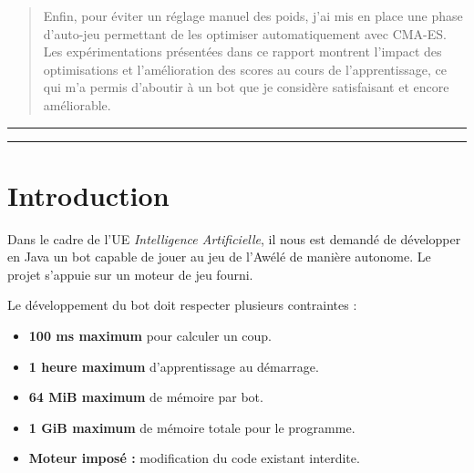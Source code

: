 \documentclass[11pt,a4paper]{article}
\newcommand{\doublebar}{%
  \par\noindent\centering
  \rule{\linewidth}{0.7pt}\par\vspace{-12pt}%
  \rule{\linewidth}{0.7pt}\par
}
\begin{document}
\begin{center}
\begin{minipage}{0.9\linewidth}
\begin{quote}
\hspace*{\parindent}Enfin, pour éviter un réglage manuel des poids, j’ai mis en place une phase d’auto-jeu permettant de les
optimiser automatiquement avec CMA-ES. Les expérimentations présentées dans ce rapport montrent l’impact des optimisations
et l’amélioration des scores au cours de l’apprentissage, ce qui m’a permis d’aboutir à un bot
que je considère satisfaisant et encore améliorable.
\end{quote}
\end{minipage}

\vspace{0.8cm}
\doublebar
\end{center}

\vspace*{\fill}
\newpage

\clearpage
\thispagestyle{empty} %

\tableofcontents

\vspace*{\fill}

\clearpage


\clearpage
\setcounter{page}{1}

\section{Introduction}
\label{sec:introduction}

Dans le cadre de l'UE \textit{Intelligence Artificielle}, il nous est demandé de développer en Java un bot capable de jouer au
jeu de l'Awélé de manière autonome. Le projet s'appuie sur un moteur de jeu fourni.

Le développement du bot doit respecter plusieurs contraintes :

\begin{itemize}
  \item \textbf{100 ms maximum} pour calculer un coup.
  \item \textbf{1 heure maximum} d'apprentissage au démarrage.
  \item \textbf{64 MiB maximum} de mémoire par bot.
  \item \textbf{1 GiB maximum} de mémoire totale pour le programme.
  \item \textbf{Moteur imposé :} modification du code existant interdite.
\end{itemize}
\end{document}
